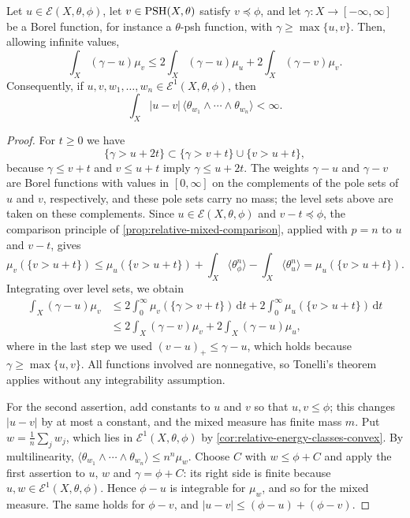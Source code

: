 \begin{lemma}\label{lem:relative-cross-energy-estimate}
Let $u\in\mathcal E(X,\theta,\phi)$, let $v\in\mathrm{PSH}(X,\theta)$ satisfy $v\preceq\phi$, and let $\gamma\colon X\to[-\infty,\infty]$ be a Borel function, for instance a $\theta$-psh function, with $\gamma\geq\max\{u,v\}$. Then, allowing infinite values,
\[
 \int_X(\gamma-u)\mu_v
       \leq2\int_X(\gamma-u)\mu_u
                          +2\int_X(\gamma-v)\mu_v.
\]
Consequently, if $u,v,w_1,\ldots,w_n\in\mathcal E^1(X,\theta,\phi)$, then
\[
 \int_X|u-v|\,\langle\theta_{w_1}\wedge\cdots\wedge\theta_{w_n}\rangle<\infty.
\]
\end{lemma}
\begin{proof}
For $t\geq0$ we have
\[
 \{\gamma>u+2t\}\subset
                     \{\gamma>v+t\}\cup\{v>u+t\},
\]
because $\gamma\leq v+t$ and $v\leq u+t$ imply $\gamma\leq u+2t$. The weights $\gamma-u$ and $\gamma-v$ are Borel functions with values in $[0,\infty]$ on the complements of the pole sets of $u$ and $v$, respectively, and these pole sets carry no mass; the level sets above are taken on these complements. Since $u\in\mathcal E(X,\theta,\phi)$ and $v-t\preceq\phi$, the comparison principle of \cref{prop:relative-mixed-comparison}, applied with $p=n$ to $u$ and $v-t$, gives
\[
 \mu_v(\{v>u+t\})\leq\mu_u(\{v>u+t\})+\int_X\langle\theta_\phi^n\rangle-\int_X\langle\theta_u^n\rangle=\mu_u(\{v>u+t\}).
\]
Integrating over level sets, we obtain
\[
 \begin{split}
 \int_X(\gamma-u)\mu_v
  &\leq2\int_0^\infty\mu_v(\{\gamma>v+t\})\,\mathrm dt
          +2\int_0^\infty\mu_u(\{v>u+t\})\,\mathrm dt\\
  &\leq2\int_X(\gamma-v)\mu_v+2\int_X(\gamma-u)\mu_u,
 \end{split}
\]
where in the last step we used $(v-u)_+\leq\gamma-u$, which holds because $\gamma\geq\max\{u,v\}$. All functions involved are nonnegative, so Tonelli's theorem applies without any integrability assumption.

For the second assertion, add constants to $u$ and $v$ so that $u,v\leq\phi$; this changes $|u-v|$ by at most a constant, and the mixed measure has finite mass $m$. Put $w=\frac1n\sum_jw_j$, which lies in $\mathcal E^1(X,\theta,\phi)$ by \cref{cor:relative-energy-classes-convex}. By multilinearity, $\langle\theta_{w_1}\wedge\cdots\wedge\theta_{w_n}\rangle\leq n^n\mu_w$. Choose $C$ with $w\leq\phi+C$ and apply the first assertion to $u$, $w$ and $\gamma=\phi+C$: its right side is finite because $u,w\in\mathcal E^1(X,\theta,\phi)$. Hence $\phi-u$ is integrable for $\mu_w$, and so for the mixed measure. The same holds for $\phi-v$, and $|u-v|\leq(\phi-u)+(\phi-v)$.
\end{proof}

